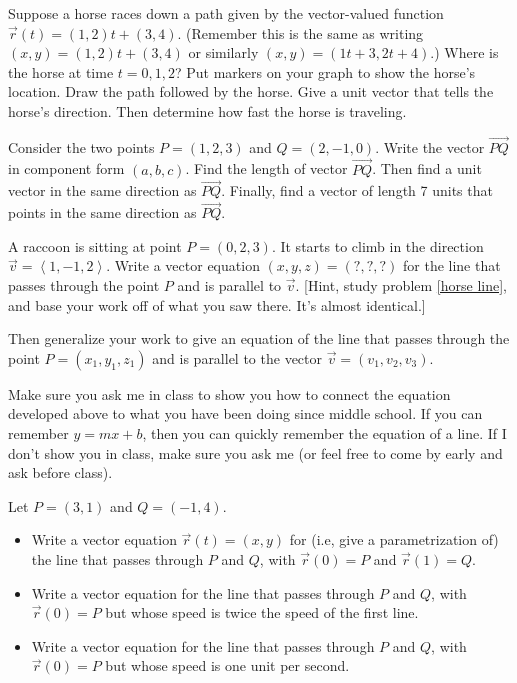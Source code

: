 \begin{problem}\label{horse line}
Suppose a horse races down a path given by the vector-valued function $\vec r(t) = (1,2)t+(3,4)$. (Remember this is the same as writing $(x,y) =  (1,2)t+(3,4)$ or similarly  $(x,y)=(1t+3,2t+4)$.)
Where is the horse at time $t=0,1,2$? Put markers on your graph to show the horse's location. Draw the path followed by the horse. Give a unit vector that tells the horse's direction. Then determine how fast the horse is traveling.
\end{problem}

\begin{problem}
%
Consider the two points $P=(1,2,3)$ and $Q=(2,-1,0)$. Write the vector $\vec {PQ}$ in component form $(a,b,c)$. Find the length of vector $\vec {PQ}$. Then find a unit vector in the same direction as $\vec{PQ}$. Finally, find a vector of length 7 units that points in the same direction as $\vec{PQ}$. 
\end{problem}


\begin{problem}
%
A raccoon is sitting at point $P=(0,2,3)$.  It starts to climb in the direction $\vec v=\left<1,-1,2\right>$.  
Write a vector equation $(x,y,z)=(?,?,?)$ for the line that passes through the point $P$ and is parallel to $\vec v$. [Hint, study problem \ref{horse line}, and base your work off of what you saw there. It's almost identical.]

Then generalize your work to give an equation of the line that passes through the point $P=(x_1,y_1,z_1)$ and is parallel to the vector $\vec v=(v_1,v_2,v_3)$. 
\end{problem}

Make sure you ask me in class to show you how to connect the equation developed above to what you have been doing since middle school. If you can remember $y=mx+b$, then you can quickly remember the equation of a line.  If I don't show you in class, make sure you ask me (or feel free to come by early and ask before class).

\begin{problem}\label{first line between two points}%
Let $P=(3,1)$ and $Q=(-1,4)$.  
\begin{itemize}
\item Write a vector equation $\vec r(t)=(x,y)$ for (i.e, give a parametrization of) the line that passes through $P$ and $Q$, with $\vec r(0)=P$ and $\vec r(1)=Q$.
\item Write a vector equation for the line that passes through $P$ and $Q$, with $\vec r(0)=P$ but whose speed is twice the speed of the first line.
\item Write a vector equation for the line that passes through $P$ and $Q$, with $\vec r(0)=P$ but whose speed is one unit per second.
\end{itemize}
\end{problem}

